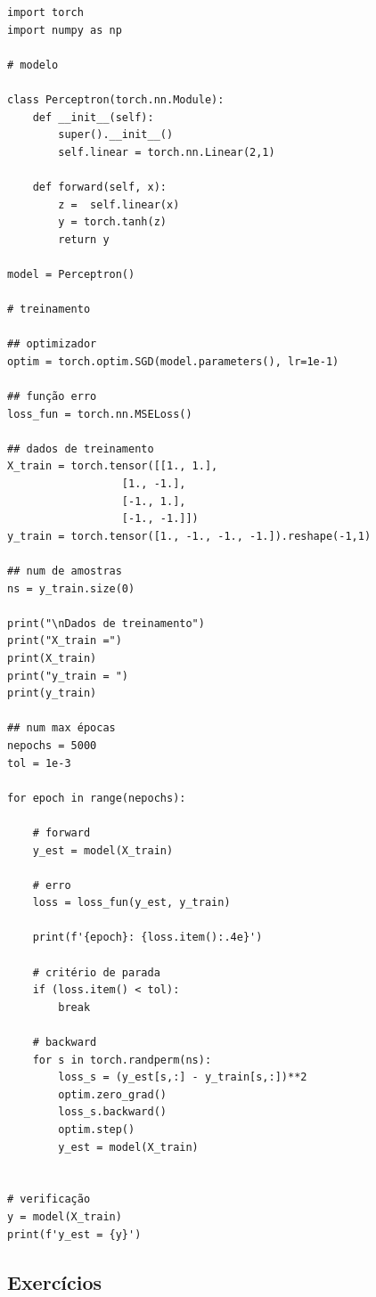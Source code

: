 % 
\begin{lstlisting}[caption=perceptron\_sgd.py, label=cap_perceptron_sec_train:cod:perceptron_sgd]
import torch
import numpy as np

# modelo

class Perceptron(torch.nn.Module):
    def __init__(self):
        super().__init__()
        self.linear = torch.nn.Linear(2,1)

    def forward(self, x):
        z =  self.linear(x)
        y = torch.tanh(z)
        return y

model = Perceptron()

# treinamento

## optimizador
optim = torch.optim.SGD(model.parameters(), lr=1e-1)

## função erro
loss_fun = torch.nn.MSELoss()

## dados de treinamento
X_train = torch.tensor([[1., 1.],
                  [1., -1.],
                  [-1., 1.],
                  [-1., -1.]])
y_train = torch.tensor([1., -1., -1., -1.]).reshape(-1,1)

## num de amostras
ns = y_train.size(0)

print("\nDados de treinamento")
print("X_train =")
print(X_train)
print("y_train = ")
print(y_train)

## num max épocas
nepochs = 5000
tol = 1e-3

for epoch in range(nepochs):

    # forward
    y_est = model(X_train)

    # erro
    loss = loss_fun(y_est, y_train)

    print(f'{epoch}: {loss.item():.4e}')

    # critério de parada
    if (loss.item() < tol):
        break

    # backward
    for s in torch.randperm(ns):
        loss_s = (y_est[s,:] - y_train[s,:])**2
        optim.zero_grad()
        loss_s.backward()
        optim.step()
        y_est = model(X_train)


# verificação
y = model(X_train)
print(f'y_est = {y}')
\end{lstlisting}


\subsection{Exercícios}

